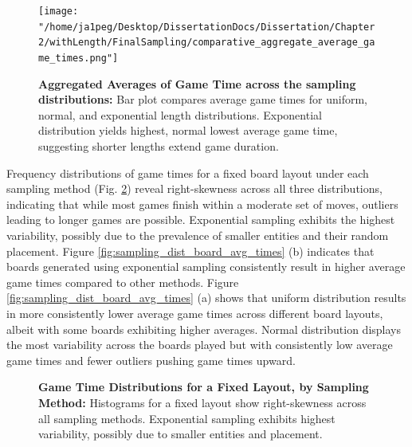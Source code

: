 \begin{figure}[ht]
	\centering
	\texttt{[image: "/home/ja1peg/Desktop/DissertationDocs/Dissertation/Chapter 2/withLength/FinalSampling/comparative\_aggregate\_average\_game\_times.png"]} 
	\caption{\textbf{Aggregated Averages of Game Time across the sampling distributions:} Bar plot compares average game times for uniform, normal, and exponential length distributions. Exponential distribution yields highest, normal lowest average game time, suggesting shorter lengths extend game duration.}
	\label{fig:sampling_dist_avg_times}
\end{figure}

Frequency distributions of game times for a fixed board layout under each sampling method (Fig. \ref{fig:sampling_dist_layout_dists}) reveal right-skewness across all three distributions, indicating that while most games finish within a moderate set of moves, outliers leading to longer games are possible. Exponential sampling exhibits the highest variability, possibly due to the prevalence of smaller entities and their random placement. Figure \ref{fig:sampling_dist_board_avg_times} (b) indicates that boards generated using exponential sampling consistently result in higher average game times compared to other methods. Figure \ref{fig:sampling_dist_board_avg_times} (a) shows that uniform distribution results in more consistently lower average game times across different board layouts, albeit with some boards exhibiting higher averages. Normal distribution displays the most variability across the boards played but with consistently low average game times and fewer outliers pushing game times upward.

\begin{figure}[ht]
	\centering
	\caption{\textbf{Game Time Distributions for a Fixed Layout, by Sampling Method:} Histograms for a fixed layout show right-skewness across all sampling methods. Exponential sampling exhibits highest variability, possibly due to smaller entities and placement.}
	\label{fig:sampling_dist_layout_dists}
\end{figure}

